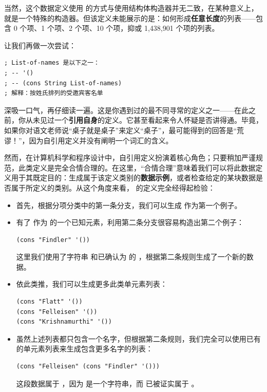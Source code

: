 当然，这个数据定义使用  的方式与使用结构体构造器并无二致，在某种意义上， 就是一个特殊的构造器。但该定义未能展示的是：如何形成\textbf{任意长度}的列表——包含 0 个项、1 个项、2 个项、10 个项，抑或 1,438,901 个项的列表。

让我们再做一次尝试：
\begin{lstlisting}[language=BSL]
; List-of-names 是以下之一：
; -- '()
; -- (cons String List-of-names)
; 解释：按姓氏排列的受邀宾客名单
\end{lstlisting}

深吸一口气，再仔细读一遍。这是你遇到过的最不同寻常的定义之一——在此之前，你从未见过一个\textbf{引用自身}的定义。它甚至看起来令人怀疑是否讲得通。毕竟，如果你对语文老师说“桌子就是桌子”来定义“桌子”，最可能得到的回答是“荒谬！”，因为自引用定义并没有阐明一个词汇的含义。

然而，在计算机科学和程序设计中，自引用定义扮演着核心角色；只要稍加严谨规范，此类定义是完全合情合理的。在这里，“合情合理”意味着我们可以将此数据定义用于其既定目的：生成属于该定义类别的\textbf{数据示例}，或者检查给定的某块数据是否属于所定义的类别。从这个角度来看， 的定义完全经得起检验：
\begin{itemize}
  \item 首先，根据分项分类中的第一条分支，我们可以生成  作为第一个例子。
  \item 有了  作为  的一个已知元素，利用第二条分支很容易构造出第二个例子：
\begin{lstlisting}[language=BSL]
(cons "Findler" '())
\end{lstlisting}
  这里我们使用了字符串  和已确认为  的 ，根据第二条规则生成了一个新的数据。
  \item 依此类推，我们可以生成更多此类单元素列表：
\begin{lstlisting}[language=BSL]
(cons "Flatt" '())
(cons "Felleisen" '())
(cons "Krishnamurthi" '())
\end{lstlisting}
  \item 虽然上述列表都只包含一个名字，但根据第二条规则，我们完全可以使用已有的单元素列表来生成包含更多名字的列表：
\begin{lstlisting}[language=BSL]
(cons "Felleisen" (cons "Findler" '()))
\end{lstlisting}
  这段数据属于 ，因为  是一个字符串，而  已被证实属于 。
\end{itemize}

